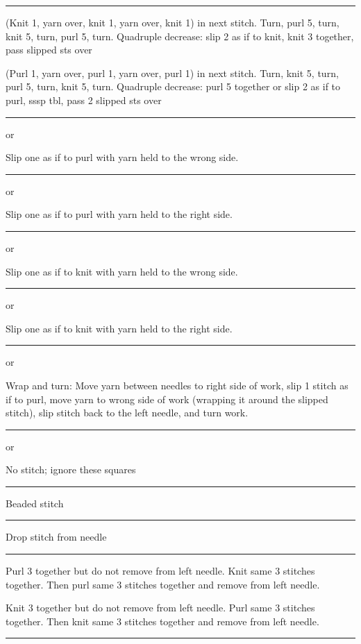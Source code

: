 \documentclass{article}
\newlength{\symbolcolwidth}
\newlength{\singlecolwidth}
\newlength{\doublecolwidth}
\newcommand\keyrow[3]{\par\allowbreak\hrule\par\nopagebreak\noindent
	\vrule\hfill 
	\begin{minipage}{\symbolcolwidth}\centering#1\end{minipage}%
	\hfill\vrule\hfill
	\begin{minipage}{\singlecolwidth}
		\raisebox{1pt}{\strut}#2\raisebox{-1pt}{\strut}\end{minipage}%
	\hfill\vrule\hfill
	\begin{minipage}{\singlecolwidth}
		\raisebox{1pt}{\strut}#3\raisebox{-1pt}{\strut}\end{minipage}%
	\hfill\vrule
	\par\nointerlineskip}
\newcommand\dblkeyrow[2]{\par\allowbreak\hrule\par\nopagebreak\noindent
	\vrule\hfill
	\begin{minipage}{\symbolcolwidth}\centering#1\end{minipage}%
	\hfill\vrule\hfill
	\begin{minipage}{\doublecolwidth}
		\raisebox{1pt}{\strut}#2\raisebox{-1pt}{\strut}\end{minipage}%
	\hfill\vrule
	\par\nointerlineskip}
\begin{document}
\begin{fullpages}
\keyrow{}
{(Knit 1, yarn over, knit 1, yarn over, knit 1) in next stitch. Turn, purl 5, turn, knit 5, turn, purl 5, turn. Quadruple decrease: slip 2 as if to knit, knit 3 together, pass slipped sts over}
{(Purl 1, yarn over, purl 1, yarn over, purl 1) in next stitch. Turn, knit 5, turn, purl 5, turn, knit 5, turn. Quadruple decrease: purl 5 together or slip 2 as if to purl, sssp tbl, pass 2 slipped sts over}
\dblkeyrow{ or }{Slip one as if to purl with yarn held to the wrong side.}
\dblkeyrow{ or \textknit{\purlbackground{S}}}
{Slip one as if to purl with yarn held to the right side.}
\dblkeyrow{\textknit{[} or \textknit{]}}{Slip one as if to knit with yarn held to the wrong side.}
\dblkeyrow{\textknit{\purlbackground{[}} or \textknit{\purlbackground{]}}}{Slip one as if to knit with yarn held to the right side.}
\dblkeyrow{ or }{Wrap and turn: Move yarn between needles to right side of work, slip 1 stitch as if to purl, move yarn to wrong side of work (wrapping it around the slipped stitch), slip stitch back to the left needle, and turn work.}
\ifgrid\dblkeyrow{\textknit{,} or }{No stitch; ignore these squares} \fi
\dblkeyrow{}{Beaded stitch}
\dblkeyrow{}{Drop stitch from needle}
\keyrow{}{Purl 3 together but do not remove from left needle. Knit same 3 stitches together. Then purl same 3 stitches together and remove from left needle.}{Knit 3 together but do not remove from left needle. Purl same 3 stitches together. Then knit same 3 stitches together and remove from left needle.}
\hrule

\clearpage


\end{fullpages}
\end{document}
